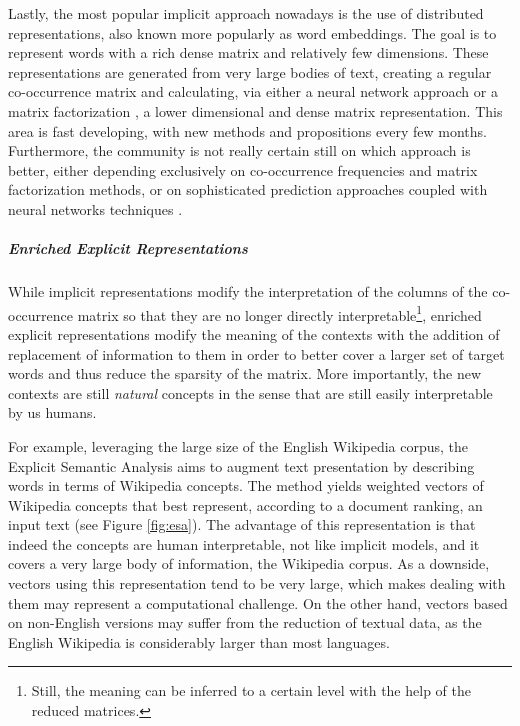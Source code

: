 Lastly, the most popular implicit approach nowadays is the use of distributed representations, also known more popularly as word embeddings. The goal is to represent words with a rich dense matrix and relatively few dimensions. These representations are generated from very large bodies of text, creating a regular co-occurrence matrix and calculating, via either a neural network approach \cite{bengio2003neural,Collobert2011,mikolov2013distributed} or a matrix factorization \cite{pennington2014glove,levy2014neural},  a lower dimensional and dense matrix representation. This area is fast developing, with new methods and propositions every few months. Furthermore, the community is not really certain still on which approach is better, either depending exclusively on co-occurrence frequencies and matrix factorization methods, or on sophisticated prediction approaches coupled with neural networks techniques \cite{baroni2014don,levy2015improving}.



\subparagraph{Enriched Explicit Representations}
While implicit representations modify the interpretation of the columns of the co-occurrence matrix so that they are no longer directly interpretable\footnote{Still, the meaning can be inferred to a certain level with the help of the reduced matrices.},  enriched explicit representations modify the meaning of the contexts with the addition of replacement of information to them in order to better cover a larger set of target words and thus reduce the sparsity of the matrix. More importantly, the new contexts are still \textit{natural} concepts in the sense that are still easily interpretable by us humans.




For example, leveraging the large size of the English Wikipedia corpus, the Explicit Semantic Analysis \cite{gabrilovich2007computing} aims to augment text presentation by describing words in terms of Wikipedia concepts. The method yields weighted vectors of Wikipedia concepts that best represent, according to a document ranking, an input text (see Figure \ref{fig:esa}).  The advantage of this representation is that indeed the concepts are human interpretable, not like implicit models, and it covers a very large body of information,  the Wikipedia corpus. As a downside, vectors using this representation tend to be very large, which makes dealing with them may represent a computational challenge.
On the other hand, vectors based on non-English versions may suffer from the reduction of textual data, as the English Wikipedia is considerably larger than most languages.

